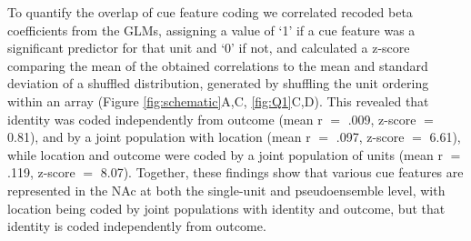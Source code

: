 \documentclass[11pt]{article}
\providecommand{\DIFadd}[1]{{\protect\color{red} \sf #1}} %
\providecommand{\DIFdel}[1]{} %
\providecommand{\DIFaddbegin}{} %
\providecommand{\DIFaddend}{} %
\providecommand{\DIFdelbegin}{} %
\providecommand{\DIFdelend}{} %
\newcommand{\DIFscaledelfig}{0.5}
\newlength{\DIFdelgraphicswidth} %
\newlength{\DIFdelgraphicsheight} %
\newcommand{\DIFaddincludegraphics}[2][]{{\color{red}\fbox{\DIFOincludegraphics[#1]{#2}}}} %
\newcommand{\DIFdelincludegraphics}[2][]{%
\sbox{\DIFdelgraphicsbox}{\DIFOincludegraphics[#1]{#2}}%
\settoboxwidth{\DIFdelgraphicswidth}{\DIFdelgraphicsbox} %
\settoboxtotalheight{\DIFdelgraphicsheight}{\DIFdelgraphicsbox} %
\scalebox{\DIFscaledelfig}{%
\parbox[b]{\DIFdelgraphicswidth}{\usebox{\DIFdelgraphicsbox}\\[-\baselineskip] \rule{\DIFdelgraphicswidth}{0em}}\llap{\resizebox{\DIFdelgraphicswidth}{\DIFdelgraphicsheight}{%
\setlength{\unitlength}{\DIFdelgraphicswidth}%
\begin{picture}(1,1)%
\thicklines\linethickness{2pt} %
{\color[rgb]{1,0,0}\put(0,0){\framebox(1,1){}}}%
{\color[rgb]{1,0,0}\put(0,0){\line( 1,1){1}}}%
{\color[rgb]{1,0,0}\put(0,1){\line(1,-1){1}}}%
\end{picture}%
}\hspace*{3pt}}} %
} %
\DeclareRobustCommand{\DIFaddbegin}{\DIFOaddbegin \let\includegraphics\DIFaddincludegraphics} %
\DeclareRobustCommand{\DIFaddend}{\DIFOaddend \let\includegraphics\DIFOincludegraphics} %
\DeclareRobustCommand{\DIFdelbegin}{\DIFOdelbegin \let\includegraphics\DIFdelincludegraphics} %
\DeclareRobustCommand{\DIFdelend}{\DIFOaddend \let\includegraphics\DIFOincludegraphics} %
\begin{document}
\DIFadd{To quantify the overlap of cue feature coding we correlated recoded beta coefficients from the GLMs, assigning a value of `1' if a cue feature was a significant predictor for that unit and `0' if not, and calculated a z-score comparing the mean of the obtained correlations to the mean and standard deviation of a shuffled distribution, generated by shuffling the unit ordering within an array (Figure \ref{fig:schematic}A,C, \ref{fig:Q1}C,}\DIFaddend D). \DIFdelbegin \DIFdel{Units
that were modulated by cue outcome showed a ramping of activity after cue-onset
for their preferred cue type. Additionally, units that exhibited a decrease in
firing in response to the cue and whose activity was modulated by cue outcome,
showed a sustained discriminatory response to reward-available and reward-unavailable cues that extended beyond cue-onset (Figure
\ref{fig:pop}F}\DIFdelend \DIFaddbegin \DIFadd{This revealed that identity was coded independently from outcome (mean r $=$ .009, z-score $=$ 0.81), and by a joint population with location (mean r $=$ .097, z-score $=$ 6.61), while location and outcome were coded by a joint population of units (mean r $=$ .119, z-score $=$ 8.07}\DIFaddend ). Together, these \DIFdelbegin \DIFdel{visualizations of the averaged population
responses revealed nuanced differences in the way NAc units are modulated by cue
conditions across cue features}\DIFdelend \DIFaddbegin \DIFadd{findings show that various cue features are represented in the NAc at both the single-unit and pseudoensemble level, with location being coded by joint populations with identity and outcome, but that identity is coded independently from outcome}\DIFaddend .
\end{document}
